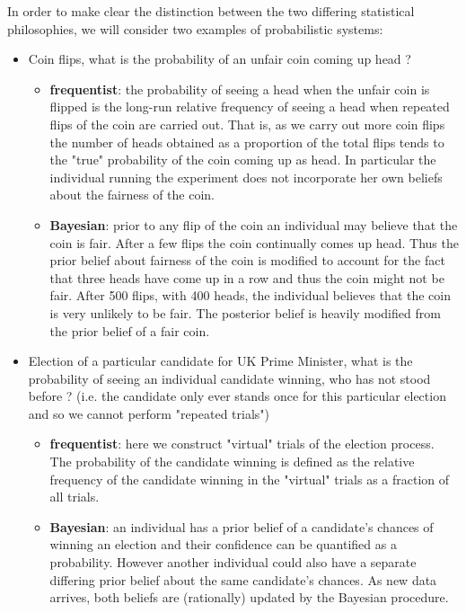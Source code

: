 In order to make clear the distinction between the two differing statistical philosophies, we will consider two examples of probabilistic systems:
\begin{itemize}
\item Coin flips, what is the probability of an unfair coin coming up head ?
\begin{itemize}
	\item \textbf{frequentist}: the probability of seeing a head when the unfair coin is flipped is the long-run relative frequency of seeing a head when repeated flips of the coin are carried out. That is, as we carry out more coin flips the number of heads obtained as a proportion of the total flips tends to the "true" probability of the coin coming up as head. In particular the individual running the experiment does not incorporate her own beliefs about the fairness of the coin.
	\item \textbf{Bayesian}: prior to any flip of the coin an individual may believe that the coin is fair. After a few flips the coin continually comes up head. Thus the prior belief about fairness of the coin is modified to account for the fact that three heads have come up in a row and thus the coin might not be fair. After 500 flips, with 400 heads, the individual believes that the coin is very unlikely to be fair. The posterior belief is heavily modified from the prior belief of a fair coin.
\end{itemize}
\item Election of a particular candidate for UK Prime Minister, what is the probability of seeing an individual candidate winning, who has not stood before ? (i.e. the candidate only ever stands once for this particular election and so we cannot perform "repeated trials") 
\begin{itemize}
	\item \textbf{frequentist}: here we construct "virtual" trials of the election process. The probability of the candidate winning is defined as the relative frequency of the candidate winning in the "virtual" trials as a fraction of all trials.	
	\item \textbf{Bayesian}: an individual has a prior belief of a candidate's chances of winning an election and their confidence can be quantified as a probability. However another individual could also have a separate differing prior belief about the same candidate's chances. As new data arrives, both beliefs are (rationally) updated by the Bayesian procedure.
\end{itemize}
\end{itemize}

